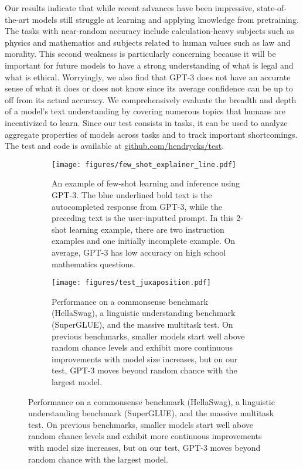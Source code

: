 \documentclass{article} \usepackage{iclr2021_conference, times}
\begin{document}
Our results indicate that while recent advances have been impressive, state-of-the-art models still struggle at learning and applying knowledge from pretraining.
The tasks with near-random accuracy include calculation-heavy subjects such as physics and mathematics and subjects related to human values such as law and morality. 
This second weakness is particularly concerning because it will be important for future models to have a strong understanding of what is legal and what is ethical. Worryingly, we also find that GPT-3 does not have an accurate sense of what it does or does not know since its average confidence can be up to  off from its actual accuracy.
We comprehensively evaluate the breadth and depth of a model's text understanding by covering numerous topics that humans are incentivized to learn.
Since our test consists in  tasks, it can be used to analyze aggregate properties of models across tasks and to track important shortcomings.
The test and code is available at \href{https://github.com/hendrycks/test}{github.com/hendrycks/test}. 











\begin{figure}[t]
\vspace{-20pt}
\begin{subfigure}{.49\textwidth}
\centering
\texttt{[image: figures/few\_shot\_explainer\_line.pdf]}
\caption{An example of few-shot learning and inference using GPT-3. The \textcolor{rightblue}{blue} underlined bold text is the autocompleted response from GPT-3, while the preceding text is the user-inputted prompt. In this 2-shot learning example, there are two instruction examples and one initially incomplete example. On average, GPT-3 has low accuracy on high school mathematics questions.}\label{fig:fewshot}
\end{subfigure}\hfill \begin{subfigure}{.49\textwidth}
\centering
\texttt{[image: figures/test\_juxaposition.pdf]}
\caption{Performance on a commonsense benchmark (HellaSwag), a linguistic understanding benchmark (SuperGLUE), and the massive multitask test. On previous benchmarks, smaller models start well above random chance levels and exhibit more continuous improvements with model size increases, but on our test, GPT-3 moves beyond random chance with the largest model.}\label{fig:juxtaposition}
\end{subfigure}
\vspace{-13pt}
\end{figure}
\end{document}
